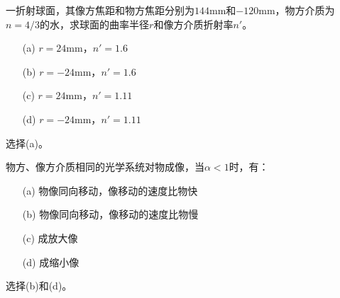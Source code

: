\documentclass[cn,11pt]{elegantbook}
\begin{document}
\begin{problem}
	一折射球面，其像方焦距和物方焦距分别为$144$mm和$-120$mm，物方介质为$n=4/3$的水，求球面的曲率半径$r$和像方介质折射率$n'$。
	\begin{itemize}
		\item [(a)] $r=24$mm，$n'=1.6$
		\item [(b)] $r=-24$mm，$n'=1.6$
		\item [(c)] $r=24$mm，$n'=1.11$
		\item [(d)] $r=-24$mm，$n'=1.11$
	\end{itemize}
\end{problem}

\begin{solution}
	选择(a)。
\end{solution}

\begin{problem}
	物方、像方介质相同的光学系统对物成像，当$\alpha<1$时，有：
	\begin{itemize}
		\item [(a)] 物像同向移动，像移动的速度比物快
		\item [(b)] 物像同向移动，像移动的速度比物慢
		\item [(c)] 成放大像
		\item [(d)] 成缩小像
	\end{itemize}
\end{problem}

\begin{solution}
	选择(b)和(d)。
\end{solution}
	
\end{document}
